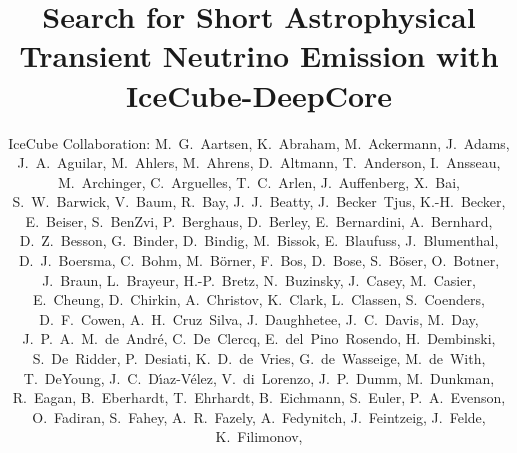 \documentclass[manuscript]{aastex}
\begin{document}
\title{Search for Short Astrophysical Transient Neutrino Emission with IceCube-DeepCore}
\author{
IceCube Collaboration:
M.~G.~Aartsen,
K.~Abraham,
M.~Ackermann,
J.~Adams,
J.~A.~Aguilar,
M.~Ahlers,
M.~Ahrens,
D.~Altmann,
T.~Anderson,
I.~Ansseau,
M.~Archinger,
C.~Arguelles,
T.~C.~Arlen,
J.~Auffenberg,
X.~Bai,
S.~W.~Barwick,
V.~Baum,
R.~Bay,
J.~J.~Beatty,
J.~Becker~Tjus,
K.-H.~Becker,
E.~Beiser,
S.~BenZvi,
P.~Berghaus,
D.~Berley,
E.~Bernardini,
A.~Bernhard,
D.~Z.~Besson,
G.~Binder,
D.~Bindig,
M.~Bissok,
E.~Blaufuss,
J.~Blumenthal,
D.~J.~Boersma,
C.~Bohm,
M.~B\"orner,
F.~Bos,
D.~Bose,
S.~B\"oser,
O.~Botner,
J.~Braun,
L.~Brayeur,
H.-P.~Bretz,
N.~Buzinsky,
J.~Casey,
M.~Casier,
E.~Cheung,
D.~Chirkin,
A.~Christov,
K.~Clark,
L.~Classen,
S.~Coenders,
D.~F.~Cowen,
A.~H.~Cruz~Silva,
J.~Daughhetee,
J.~C.~Davis,
M.~Day,
J.~P.~A.~M.~de~Andr\'e,
C.~De~Clercq,
E.~del~Pino~Rosendo,
H.~Dembinski,
S.~De~Ridder,
P.~Desiati,
K.~D.~de~Vries,
G.~de~Wasseige,
M.~de~With,
T.~DeYoung,
J.~C.~D{\'\i}az-V\'elez,
V.~di~Lorenzo,
J.~P.~Dumm,
M.~Dunkman,
R.~Eagan,
B.~Eberhardt,
T.~Ehrhardt,
B.~Eichmann,
S.~Euler,
P.~A.~Evenson,
O.~Fadiran,
S.~Fahey,
A.~R.~Fazely,
A.~Fedynitch,
J.~Feintzeig,
J.~Felde,
K.~Filimonov,
}
\end{document}
